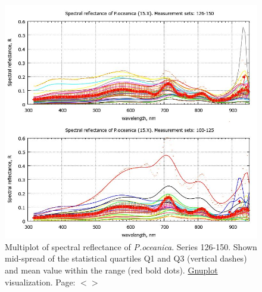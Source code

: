 \documentclass[11pt]{article}
\begin{document}
\begin{appendices}
\begin{figure}[H]
	\begin{center}
		\includegraphics[scale=0.5]{GNU-14.jpg}
		\caption{Multiplot of spectral reflectance of \textit{P.oceanica}. Series 126-150. Shown mid-spread of the statistical quartiles Q1 and Q3 (vertical dashes) and mean value within the range (red bold dots). \href{http://www.gnuplot.info/}{Gnuplot} visualization. Page: $<$\pageref{page-39}$>$­}
		\label{fig:A.27}
	\end{center}
\end{figure}


\pagebreak


\end{appendices}
\end{document}
